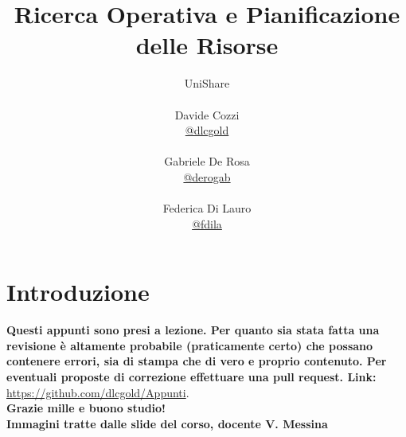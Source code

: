 \message{ !name(ro.tex)}\documentclass[a4paper,12pt, oneside]{book}
\title{Ricerca Operativa e Pianificazione delle Risorse}
\author{UniShare\\\\Davide Cozzi\\\href{https://t.me/dlcgold}{@dlcgold}\\\\Gabriele De Rosa\\\href{https://t.me/derogab}{@derogab} \\\\Federica Di Lauro\\\href{https://t.me/f_dila}{@f\textunderscore dila}}
\date{}
\begin{document}

\maketitle

\newtheorem{teorema}{Teorema}
\newtheorem{definizione}{Definizione}
\newtheorem{esempio}{Esempio}
\newtheorem{corollario}{Corollario}
\newtheorem{lemma}{Lemma}
\newtheorem{osservazione}{Osservazione}
\newtheorem{nota}{Nota}
\newtheorem{esercizio}{Esercizio}
\tableofcontents
\renewcommand{\chaptermark}[1]{%
  \markboth{\chaptername
    \ \thechapter.\ #1}{}}
\renewcommand{\sectionmark}[1]{\markright{\thesection.\ #1}}
\chapter{Introduzione}
\textbf{Questi appunti sono presi a lezione. Per quanto sia stata
  fatta una revisione è altamente probabile (praticamente certo)
  che possano contenere errori, sia di stampa che di vero e proprio
  contenuto. Per eventuali proposte di correzione effettuare una
  pull request. Link: } \url{https://github.com/dlcgold/Appunti}.\\
\textbf{Grazie mille e buono studio!}\\
\textbf{Immagini tratte dalle slide del corso, docente V. Messina}
\end{document}
